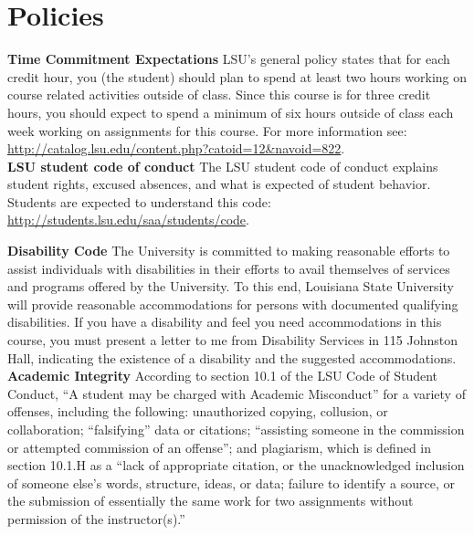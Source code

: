 \documentclass[11pt,article,oneside]{memoir}
\begin{document}
\section{Policies}

\noindent \textbf{Time Commitment Expectations}
LSU's general policy states that for each credit hour, you (the student) should plan to
spend at least two hours working on course related activities outside of class. Since this course is for three credit hours, you should expect to spend a minimum of six hours outside of class each week working on assignments for this course. For more information see: 
\url{http://catalog.lsu.edu/content.php?catoid=12&navoid=822}.\\

\noindent \textbf{LSU student code of conduct}
The LSU student code of conduct explains student rights, excused absences, and what is expected of student behavior. Students are expected to understand this code:  \url{http://students.lsu.edu/saa/students/code}.\\ 

\clearpage

\noindent \textbf{Disability Code}
The University is committed to making reasonable efforts to assist individuals with disabilities in
their efforts to avail themselves of services and programs offered by the University. To this end,
Louisiana State University will provide reasonable accommodations for persons with
documented qualifying disabilities. If you have a disability and feel you need accommodations in
this course, you must present a letter to me from Disability Services in 115 Johnston Hall,
indicating the existence of a disability and the suggested accommodations.\\

\noindent \textbf{Academic Integrity}
According to section 10.1 of the LSU Code of Student Conduct, ``A student may be charged with Academic Misconduct'' for a variety of offenses, including the following: unauthorized copying, collusion, or collaboration; ``falsifying'' data or citations; ``assisting someone in the commission or attempted commission of an offense''; and plagiarism, which is defined in section 10.1.H as a ``lack of appropriate citation, or the unacknowledged inclusion of someone else's words, structure, ideas, or data; failure to identify a source, or the submission of essentially the same work for two assignments without permission of the instructor(s).''\\
\end{document}
